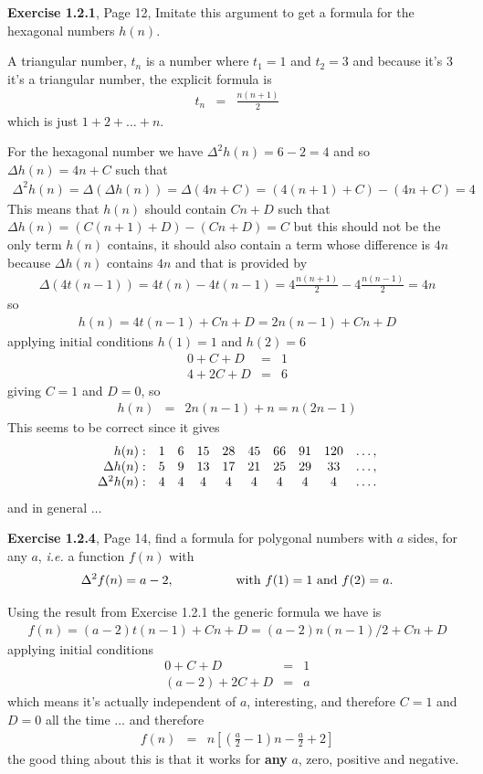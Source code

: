 \documentclass[aps,preprint,preprintnumbers,nofootinbib,showpacs,prd]{revtex4-1}
\newcommand{\ie}{{\it i.e.} }
\newcommand{\nbea}{\begin{eqnarray*}}
\newcommand{\neea}{\end{eqnarray*}}
\begin{document}
{\bf Exercise 1.2.1}, Page 12, Imitate this argument to get a formula for the hexagonal numbers $h(n)$.

A triangular number, $t_n$ is a number where $t_1=1$ and $t_2 = 3$ and because it's 3 it's a triangular number, the explicit formula is
%
\nbea
t_n & = & \frac{n(n+1)}{2}
\neea
%
which is just $1 + 2 + \ldots + n$.

For the hexagonal number we have $\Delta^2h(n) = 6-2 = 4$ and so $\Delta h(n) = 4n + C$ such that
%
\nbea
\Delta^2h(n) = \Delta(\Delta h(n)) = \Delta(4n+C) = (4(n+1)+C) - (4n+C) = 4
\neea
%
This means that $h(n)$ should contain $Cn+D$ such that $\Delta h(n) = (C(n+1) + D) - (Cn+D) = C$ but this should not be the only term $h(n)$ contains, it should also contain a term whose difference is $4n$ because $\Delta h(n)$ contains $4n$ and that is provided by
%
\nbea
\Delta(4t(n-1)) = 4t(n) - 4t(n-1) = 4\frac{n(n+1)}{2} - 4\frac{n(n-1)}{2} = 4n
\neea
%
so
%
\nbea
h(n) = 4t(n-1) + Cn + D = 2n(n-1) + Cn + D
\neea
%
applying initial conditions $h(1) = 1$ and $h(2) = 6$
%
\nbea
0 + C + D & = & 1 \\
4 + 2C + D & = & 6
\neea
%
giving $C=1$ and $D=0$, so
%
\nbea
h(n) & = & 2n(n-1) + n = n(2n-1)
\neea
%
This seems to be correct since it gives
%
\nbea
\begin{array}{r c c c c c c c c c}
h(n): & 1 & 6 & 15 & 28 & 45 & 66 & 91 & 120 & \ldots, \\
\Delta h(n): & 5 & 9 & 13 & 17 & 21 & 25 & 29 & 33 & \ldots, \\
\Delta^2h(n): & 4 & 4 & 4 & 4 & 4 & 4 & 4 & 4 & \ldots .
\end{array}
\neea
%
and in general $\ldots$

{\bf Exercise 1.2.4}, Page 14, find a formula for polygonal numbers with $a$ sides, for any $a$, \ie a function $f(n)$ with
%
\nbea
\Delta^2f(n) = a - 2, & ~~~~~~~~~~~~ & {\rm with~} f(1) = 1 {\rm ~and~} f(2) = a.
\neea
%

Using the result from Exercise 1.2.1 the generic formula we have is
%
\nbea
f(n) = (a-2)t(n-1) + Cn + D = (a-2)n(n-1)/2 + Cn + D
\neea
%
applying initial conditions
%
\nbea
0 + C + D & = & 1 \\
(a-2) + 2C + D & = & a
\neea
%
which means it's actually independent of $a$, interesting, and therefore $C=1$ and $D=0$ all the time $\ldots$ and therefore
%
\nbea
f(n) & = & n\left\lbrack\left(\frac{a}{2}-1\right)n - \frac{a}{2} + 2\right\rbrack
\neea
%
the good thing about this is that it works for {\bf any} $a$, zero, positive and negative.
\end{document}
